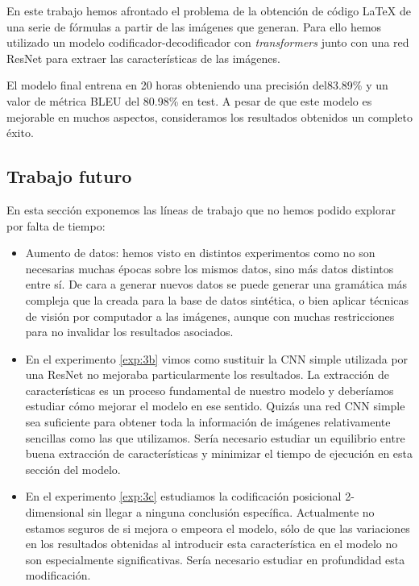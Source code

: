 \documentclass[a4paper, 20pt, dvipsnames]{article}
\begin{document}
En este trabajo hemos afrontado el problema de la obtención de código
\LaTeX{} de una serie de fórmulas a partir de las imágenes que generan.
Para ello hemos utilizado un modelo codificador-decodificador con
\emph{transformers} junto con una red ResNet para extraer las características
de las imágenes.

El modelo final entrena en 20 horas obteniendo una precisión del83.89\%
y un valor de métrica BLEU del 80.98\% en test. A pesar de que este modelo
es mejorable en muchos aspectos, consideramos los resultados obtenidos un
completo éxito.

\subsection{Trabajo futuro}

En esta sección exponemos las líneas de trabajo que no hemos podido explorar
por falta de tiempo:

\begin{itemize}
\item
	Aumento de datos: hemos visto en distintos experimentos como no son
	necesarias muchas épocas sobre los mismos datos, sino más datos distintos
	entre sí. De cara a generar nuevos datos se puede generar una gramática más
	compleja que la creada para la base de datos sintética, o bien aplicar
	técnicas de visión por computador a las imágenes, aunque con muchas
	restricciones para no invalidar los resultados asociados.
	
\item
	En el experimento \ref{exp:3b} vimos como sustituir la CNN simple utilizada
	por una ResNet no mejoraba particularmente los resultados. La extracción
	de características es un proceso fundamental de nuestro modelo y deberíamos
	estudiar cómo mejorar el modelo en ese sentido. Quizás una red CNN simple
	sea suficiente para obtener toda la información de imágenes relativamente
	sencillas como las que utilizamos. Sería necesario estudiar un equilibrio
	entre buena extracción de características y minimizar el tiempo de ejecución
	en esta sección del modelo.
	
\item
        En el experimento \ref{exp:3c} estudiamos la codificación posicional
        2-dimensional sin llegar a ninguna conclusión específica. Actualmente no
        estamos seguros de si mejora o empeora el modelo, sólo de que las
        variaciones en los resultados obtenidas al introducir esta
        característica en el modelo no son especialmente significativas. Sería
        necesario estudiar en profundidad esta modificación.
\end{itemize}


\printbibliography
\end{document}
